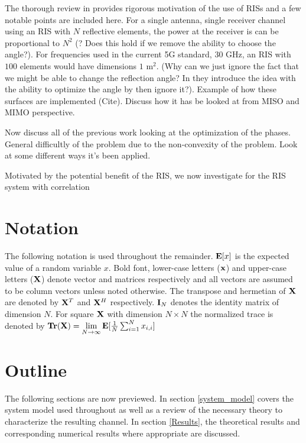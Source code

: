 \documentclass[12pt,a4paper]{report}
\begin{document}
The thorough review in \cite{basar2019wireless} provides rigorous motivation of the use of RISs and a few notable points are included here.
For a single antenna, single receiver channel using an RIS with $N$ reflective elements, the power at the receiver is can be proportional to $N^2$ (? Does this hold if we remove the ability to choose the angle?).
For frequencies used in the current 5G standard, 30 GHz, an RIS with $100$ elements would have dimensions $1$ $\text{m}^2$.
(Why can we just ignore the fact that we might be able to change the reflection angle? In \cite{basar2019wireless} they introduce the idea with the ability to optimize the angle by then ignore it?).
Example of how these surfaces are implemented (Cite).
Discuss how it has be looked at from MISO and MIMO perspective.
\par
Now discuss all of the previous work looking at the optimization of the phases. 
General difficultly of the problem due to the non-convexity of the problem. Look at some different ways it's been applied.

\par

\par
Motivated by the potential benefit of the RIS, we now investigate for the RIS system with correlation

\section{Notation}
The following notation is used throughout the remainder. 
$\mathop{\bf E{}}[x]$ is the expected value of a random variable $x$.
Bold font, lower-case letters ($\mathbf{x}$) and upper-case letters ($\mathbf{X}$) denote vector and matrices respectively and all vectors are assumed to be column vectors unless noted otherwise. 
The transpose and hermetian of $\mathbf{X}$ are denoted by $\mathbf{X}^T$ and $\mathbf{X}^H$ respectively.
$\mathbf{I}_N$ denotes the identity matrix of dimension $N$.
For square $\mathbf{X}$ with dimension $N\times N$ the normalized trace is denoted by $\mathop{\bf Tr}(\mathbf{X})  = \underset{N \rightarrow \infty}{\text{lim}}
\mathop{\bf E{}}[\frac{1}{N}\sum_{i=1}^N x_{i,i}]$

\section{Outline}
The following sections are now previewed. In section \ref{system_model} covers the system model used throughout as well as a review of the necessary theory to characterize the resulting channel. In section \ref{Results}, the theoretical results and corresponding numerical results where appropriate are discussed. 
\end{document}
